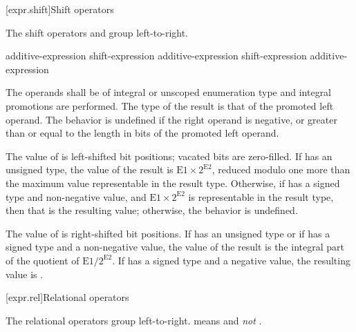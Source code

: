 [expr.shift]{Shift operators}

\pnum
{}%
%
%
%
%
The shift operators \tcode{\shl} and \tcode{\shr} group left-to-right.

%
%
%
%
%
\begin{bnf}
\br
    additive-expression\br
    shift-expression \terminal{\shl} additive-expression\br
    shift-expression \terminal{\shr} additive-expression
\end{bnf}

The operands shall be of integral or unscoped enumeration type and integral
promotions are performed. The type of the result is that of the promoted
left operand.
%
The behavior is undefined if the right operand is negative, or greater
than or equal to the length in bits of the promoted left operand.

\pnum
The value of  is  left-shifted  bit positions; vacated bits are
zero-filled. If  has an unsigned type, the value of the result
is $\mathrm{E1}\times2^\mathrm{E2}$, reduced modulo
one more than the maximum value representable in the result type. Otherwise, if
 has a signed type and non-negative value, and $\mathrm{E1}\times2^\mathrm{E2}$ is
representable in the result type, then that is the resulting value; otherwise, the
behavior is undefined.

\pnum
The value of  is  right-shifted 
bit positions. If  has an unsigned type or if  has a
signed type and a non-negative value, the value of the result is the
integral part of the quotient of $\mathrm{E1}/2^\mathrm{E2}$. If 
%
has a signed type and a negative value, the resulting value is
.

[expr.rel]{Relational operators}%
%

\pnum
The relational operators group left-to-right.
\enterexample 
{} means  and \emph{not}
.
\exitexample 

